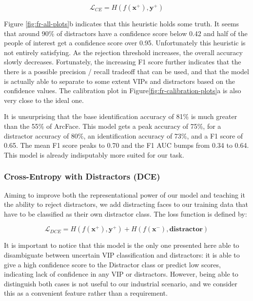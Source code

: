 \begin{equation}
    \mathcal{L}_{CE} = H(f(\textbf{x}^+), \textbf{y}^+)
\end{equation}

Figure \ref{fig:fr-all-plots}b indicates that this heuristic holds some truth. It seems that around 90\% of distractors have a confidence score below 0.42 and half of the people of interest get a confidence score over 0.95. Unfortunately this heuristic is not entirely satisfying. As the rejection threshold increases, the overall accuracy slowly decreases. Fortunately, the increasing F1 score further indicates that the there is a possible precision / recall tradeoff that can be used, and that the model is actually able to separate to some extent VIPs and distractors based on the confidence values. The calibration plot in Figure\ref{fig:fr-calibration-plots}a is also very close to the ideal one.

It is unsurprising that the base identification accuracy of 81\% is much greater than the 55\% of ArcFace. This model gets a peak accuracy of 75\%, for a distractor accuracy of 80\%, an identification accuracy of 73\%, and a F1 score of 0.65. The mean F1 score peaks to 0.70 and the F1 \ac{AUC} bumps from 0.34 to 0.64. This model is already indisputably more suited for our task. 

\subsubsection{Cross-Entropy with Distractors (DCE)}
\label{sec:dce}

Aiming to improve both the representational power of our model and teaching it the ability to reject distractors, we add distracting faces to our training data that have to be classified as their own distractor class. The loss function is defined by:

\begin{equation}
    \mathcal{L}_{DCE} = H(f(\mathbf{x}^+), \mathbf{y}^+) + H(f(\mathbf{x}^-), \textbf{distractor})
\end{equation}

It is important to notice that this model is the only one presented here able to disambiguate between uncertain VIP classification and distractors: it is able to give a high confidence score to the Distractor class or predict low scores, indicating lack of confidence in any VIP or distractors. However, being able to distinguish both cases is not useful to our industrial scenario, and we consider this as a convenient feature rather than a requirement.

